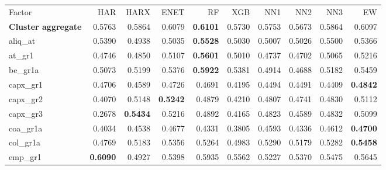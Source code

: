 \begin{longtable}{>{\raggedright\arraybackslash}p{2.6cm}rrrrrrrrr}
\hline
\multicolumn{10}{@{}l}{\textit{Panel C. Investment}} \\
\hline
Factor & HAR & HARX & ENET & RF & XGB & NN1 & NN2 & NN3 & EW \\
\hline
\textbf{Cluster aggregate} & 0.5763 & \cellcolor{blue!10}0.5864 & \cellcolor{blue!10}0.6079 & \textbf{\cellcolor{blue!10}0.6101} & 0.5730 & 0.5753 & 0.5673 & \cellcolor{blue!10}0.5864 & \cellcolor{blue!10}0.6097 \\
aliq\_at & 0.5390 & 0.4938 & 0.5035 & \textbf{\cellcolor{blue!10}0.5528} & 0.5030 & 0.5007 & 0.5026 & \cellcolor{blue!10}0.5500 & 0.5366 \\
at\_gr1 & 0.4746 & \cellcolor{blue!10}0.4850 & \cellcolor{blue!10}0.5107 & \textbf{\cellcolor{blue!10}0.5601} & \cellcolor{blue!10}0.5010 & 0.4737 & 0.4702 & \cellcolor{blue!10}0.5065 & \cellcolor{blue!10}0.5216 \\
be\_gr1a & 0.5073 & \cellcolor{blue!10}0.5199 & \cellcolor{blue!10}0.5376 & \textbf{\cellcolor{blue!10}0.5922} & \cellcolor{blue!10}0.5381 & 0.4914 & 0.4688 & \cellcolor{blue!10}0.5182 & \cellcolor{blue!10}0.5459 \\
capx\_gr1 & 0.4706 & 0.4589 & \cellcolor{blue!10}0.4726 & 0.4691 & 0.4195 & 0.4494 & 0.4491 & 0.4409 & \textbf{\cellcolor{blue!10}0.4842} \\
capx\_gr2 & 0.4070 & \cellcolor{blue!10}0.5148 & \textbf{\cellcolor{blue!10}0.5242} & \cellcolor{blue!10}0.4879 & \cellcolor{blue!10}0.4210 & \cellcolor{blue!10}0.4807 & \cellcolor{blue!10}0.4741 & \cellcolor{blue!10}0.4830 & \cellcolor{blue!10}0.5112 \\
capx\_gr3 & 0.2678 & \textbf{\cellcolor{blue!10}0.5434} & \cellcolor{blue!10}0.5216 & \cellcolor{blue!10}0.4892 & \cellcolor{blue!10}0.4165 & \cellcolor{blue!10}0.4823 & \cellcolor{blue!10}0.4589 & \cellcolor{blue!10}0.4832 & \cellcolor{blue!10}0.5099 \\
coa\_gr1a & 0.4034 & \cellcolor{blue!10}0.4538 & \cellcolor{blue!10}0.4677 & \cellcolor{blue!10}0.4331 & 0.3805 & \cellcolor{blue!10}0.4593 & \cellcolor{blue!10}0.4336 & \cellcolor{blue!10}0.4612 & \textbf{\cellcolor{blue!10}0.4700} \\
col\_gr1a & 0.4769 & \cellcolor{blue!10}0.5183 & \cellcolor{blue!10}0.5356 & \cellcolor{blue!10}0.5264 & \cellcolor{blue!10}0.4983 & \cellcolor{blue!10}0.5290 & \cellcolor{blue!10}0.5179 & \cellcolor{blue!10}0.5282 & \textbf{\cellcolor{blue!10}0.5458} \\
emp\_gr1 & \textbf{0.6090} & 0.4927 & 0.5398 & 0.5935 & 0.5562 & 0.5227 & 0.5370 & 0.5475 & 0.5645 \\

\end{longtable}
